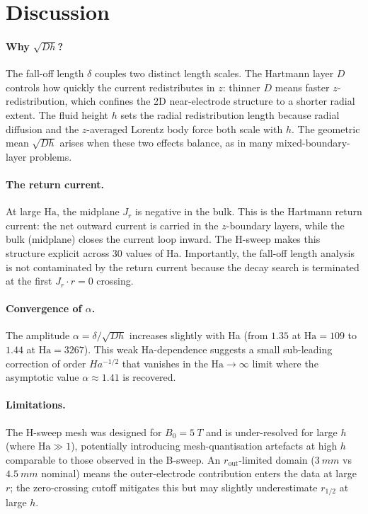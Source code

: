 \documentclass[11pt, a4paper]{article}
\begin{document}
\section{Discussion}

\paragraph{Why $\sqrt{Dh}$?}
The fall-off length $\delta$ couples two distinct length scales.
The Hartmann layer $D$ controls how quickly the current redistributes in $z$: thinner
$D$ means faster $z$-redistribution, which confines the 2D near-electrode structure
to a shorter radial extent.
The fluid height $h$ sets the radial redistribution length because radial diffusion
and the $z$-averaged Lorentz body force both scale with $h$.
The geometric mean $\sqrt{Dh}$ arises when these two effects balance, as in many
mixed-boundary-layer problems.

\paragraph{The return current.}
At large $\mathrm{Ha}$, the midplane $J_r$ is negative in the bulk.
This is the Hartmann return current: the net outward current is carried in the
$z$-boundary layers, while the bulk (midplane) closes the current loop inward.
The H-sweep makes this structure explicit across 30 values of Ha.
Importantly, the fall-off length analysis is not contaminated by the return current
because the decay search is terminated at the first $J_r\cdot r = 0$ crossing.

\paragraph{Convergence of $\alpha$.}
The amplitude $\alpha = \delta/\sqrt{Dh}$ increases slightly with Ha
(from $1.35$ at $\mathrm{Ha}=109$ to $1.44$ at $\mathrm{Ha}=3267$).
This weak Ha-dependence suggests a small sub-leading correction of order $Ha^{-1/2}$
that vanishes in the $\mathrm{Ha}\to\infty$ limit where the asymptotic value
$\alpha\approx 1.41$ is recovered.

\paragraph{Limitations.}
The H-sweep mesh was designed for $B_0 = \SI{5}{T}$ and is under-resolved for large
$h$ (where $\mathrm{Ha}\gg 1$), potentially introducing mesh-quantisation artefacts
at high $h$ comparable to those observed in the B-sweep.
An $r_\mathrm{out}$-limited domain ($\SI{3}{mm}$ vs $\SI{4.5}{mm}$ nominal) means
the outer-electrode contribution enters the data at large $r$; the zero-crossing
cutoff mitigates this but may slightly underestimate $r_{1/2}$ at large $h$.
\end{document}
